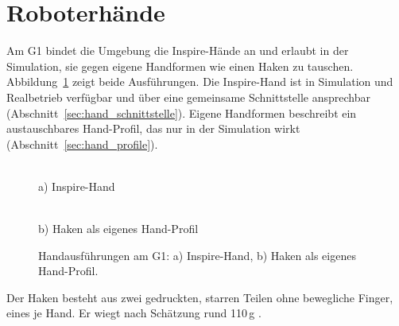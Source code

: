 \section{Roboterhände}
\label{sec:haende}
Am G1 bindet die Umgebung die Inspire-Hände an und erlaubt in der Simulation, sie gegen eigene Handformen wie einen Haken zu tauschen.
Abbildung~\ref{fig:haende} zeigt beide Ausführungen.
Die Inspire-Hand ist in Simulation und Realbetrieb verfügbar und über eine gemeinsame Schnittstelle ansprechbar (Abschnitt~\ref{sec:hand_schnittstelle}).
Eigene Handformen beschreibt ein austauschbares Hand-Profil, das nur in der Simulation wirkt (Abschnitt~\ref{sec:hand_profile}).

\begin{figure}[htbp]
  \centering
  \begin{minipage}[t]{0.48\textwidth}
    \centering
    \\[1mm]
    {\small a) Inspire-Hand}
  \end{minipage}\hfill
  \begin{minipage}[t]{0.48\textwidth}
    \centering
    \\[1mm]
    {\small b) Haken als eigenes Hand-Profil}
  \end{minipage}
  \caption[Handausführungen am G1]{Handausführungen am G1: a) Inspire-Hand, b) Haken als eigenes Hand-Profil.}
  \label{fig:haende}
\end{figure}


Der Haken besteht aus zwei gedruckten, starren Teilen ohne bewegliche Finger, eines je Hand.
Er wiegt nach Schätzung rund 110\,g .

